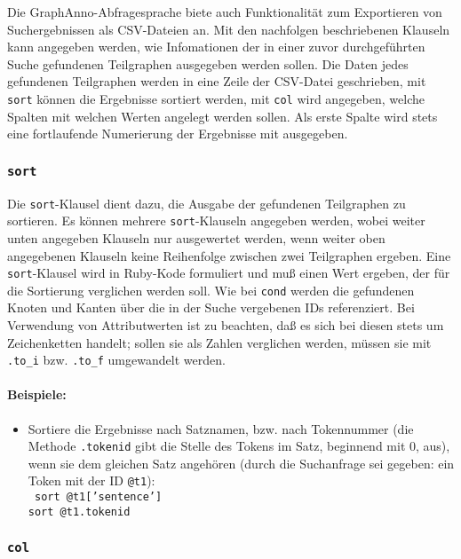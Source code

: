 \documentclass[12pt]{scrartcl}
\begin{document}
Die GraphAnno-Abfragesprache biete auch Funktionalität zum Exportieren von Suchergebnissen als CSV-Dateien an. 
Mit den nachfolgen beschriebenen Klauseln kann angegeben werden, wie Infomationen der in einer zuvor durchgeführten Suche gefundenen Teilgraphen ausgegeben werden sollen.
Die Daten jedes gefundenen Teilgraphen werden in eine Zeile der CSV-Datei geschrieben, mit \texttt{sort} können die Ergebnisse sortiert werden, mit \texttt{col} wird angegeben, welche Spalten mit welchen Werten angelegt werden sollen. Als erste Spalte wird stets eine fortlaufende Numerierung der Ergebnisse mit ausgegeben.

\subsubsection{\texttt{sort}}

Die \texttt{sort}-Klausel dient dazu, die Ausgabe der gefundenen Teilgraphen zu sortieren. Es können mehrere \texttt{sort}-Klauseln angegeben werden, wobei weiter unten angegeben Klauseln nur ausgewertet werden, wenn  weiter oben angegebenen Klauseln keine Reihenfolge zwischen zwei Teilgraphen ergeben. 
Eine \texttt{sort}-Klausel wird in Ruby-Kode formuliert und muß einen Wert ergeben, der für die Sortierung verglichen werden soll. Wie bei \texttt{cond} werden die gefundenen Knoten und Kanten über die in der Suche vergebenen IDs referenziert. Bei Verwendung von Attributwerten ist zu beachten, daß es sich bei diesen stets um Zeichenketten handelt; sollen sie als Zahlen verglichen werden, müssen sie mit \texttt{.to\_i} bzw. \texttt{.to\_f} umgewandelt werden.

\paragraph*{Beispiele:}
\begin{itemize}
	\item Sortiere die Ergebnisse nach Satznamen, bzw. nach Tokennummer (die Methode \texttt{.tokenid} gibt die Stelle des Tokens im Satz, beginnend mit 0, aus), wenn sie dem gleichen Satz angehören (durch die Suchanfrage sei gegeben: ein Token mit der ID \texttt{@t1}):\\
	{\tt
	sort @t1['sentence']\\[-.4ex]
	sort @t1.tokenid\\[-.4ex]
	}
\end{itemize}



\subsubsection{\texttt{col}}
\end{document}
